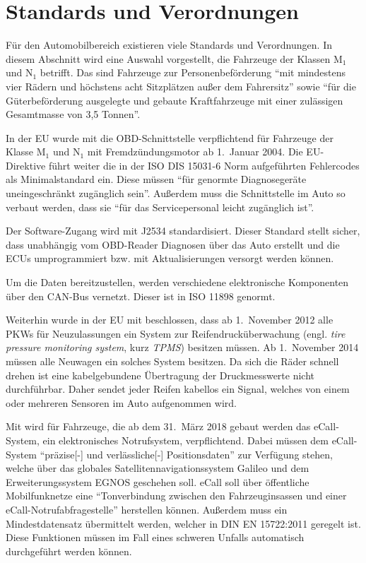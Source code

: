 \chapter{Standards und Verordnungen}\label{ch:standards}
Für den Automobilbereich existieren viele Standards und Verordnungen. In diesem
Abschnitt wird eine Auswahl vorgestellt, die Fahrzeuge der Klassen M$_1$ und
N$_1$ betrifft. Das sind Fahrzeuge zur Personenbeförderung
\enquote{mit mindestens vier Rädern und höchstens acht Sitzplätzen außer dem Fahrersitz}
sowie \enquote{für die Güterbeförderung ausgelegte und gebaute Kraftfahrzeuge
mit einer zulässigen Gesamtmasse von 3,5 Tonnen}\cite{Richtlinie70/156/EWG:Fahrzeugklassen}.

In der EU wurde mit \cite{EUDirective98/69/EC} die OBD-Schnittstelle
verpflichtend für Fahrzeuge der Klasse M$_1$ und N$_1$ mit Fremdzündungsmotor
ab 1.~Januar 2004. Die EU-Direktive führt weiter die in der ISO DIS 15031-6
Norm aufgeführten Fehlercodes als Minimalstandard ein. Diese müssen
\enquote{für genormte Diagnosegeräte \elide uneingeschränkt zugänglich sein}.
Außerdem muss die Schnittstelle im Auto so verbaut werden, dass sie
\enquote{für das Servicepersonal leicht zugänglich \elide ist}.

Der Software-Zugang wird mit J2534 \cite{SAE2004} standardisiert. Dieser
Standard stellt sicher, dass unabhängig vom OBD-Reader Diagnosen über das
Auto erstellt und die ECUs umprogrammiert bzw. mit Aktualisierungen versorgt
werden können.

Um die Daten bereitzustellen, werden verschiedene elektronische Komponenten
über den CAN-Bus vernetzt. Dieser ist in ISO 11898 genormt.

Weiterhin wurde in der EU mit \cite{EURegulation661/2009} beschlossen, dass ab
1.~November 2012 alle PKWs für Neuzulassungen ein System zur
Reifendrucküberwachung (engl. \textit{tire pressure monitoring system}, kurz
\textit{TPMS}) besitzen müssen. Ab 1.~November 2014 müssen alle Neuwagen ein
solches System besitzen. Da sich die Räder schnell drehen ist eine
kabelgebundene Übertragung der Druckmesswerte nicht durchführbar. Daher sendet
jeder Reifen kabellos ein Signal, welches von einem oder mehreren Sensoren im
Auto aufgenommen wird.

Mit \cite{EURegulation2015/ecall} wird für Fahrzeuge, die ab dem 31.~März 2018
gebaut werden das eCall-System, ein elektronisches Notrufsystem, verpflichtend.
Dabei müssen dem eCall-System \enquote{präzise\mbox{[-]} und verlässliche\mbox{[-]}
Positionsdaten} zur Verfügung stehen, welche über das globales
Satellitennavigationssystem Galileo und dem Erweiterungssystem EGNOS geschehen
soll. eCall soll über öffentliche Mobilfunknetze eine \enquote{Tonverbindung
zwischen den Fahrzeuginsassen und einer eCall-Notrufabfragestelle} herstellen
können. Außerdem muss ein Mindestdatensatz übermittelt werden, welcher in
DIN EN 15722:2011 geregelt ist. Diese Funktionen müssen im Fall eines schweren
Unfalls automatisch durchgeführt werden können.